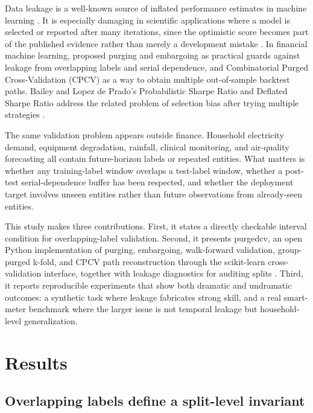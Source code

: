 \documentclass[10pt]{article}
\newcommand{\pcv}{\textsf{purgedcv}}
\newcommand{\pkg}[1]{\textsf{#1}}
\begin{document}
Data leakage is a well-known source of inflated performance estimates in
machine learning \citep{kaufman2012}. It is especially damaging in scientific
applications where a model is selected or reported after many iterations, since
the optimistic score becomes part of the published evidence rather than merely a
development mistake \citep{mcdermott2021}. In financial machine learning,
\citet{lopezdeprado2018afml} proposed purging and embargoing as practical
guards against leakage from overlapping labels and serial dependence, and
Combinatorial Purged Cross-Validation (CPCV) as a way to obtain multiple
out-of-sample backtest paths. Bailey and Lopez de Prado's Probabilistic Sharpe
Ratio and Deflated Sharpe Ratio address the related problem of selection bias
after trying multiple strategies \citep{bailey2012psr,bailey2014dsr}.

The same validation problem appears outside finance. Household electricity
demand, equipment degradation, rainfall, clinical monitoring, and air-quality
forecasting all contain future-horizon labels or repeated entities. What matters
is whether any training-label window overlaps a test-label window, whether a
post-test serial-dependence buffer has been respected, and whether the
deployment target involves unseen entities rather than future observations from
already-seen entities.

This study makes three contributions. First, it states a directly checkable
interval condition for overlapping-label validation. Second, it presents \pcv,
an open Python implementation of purging, embargoing, walk-forward validation,
group-purged k-fold, and CPCV path reconstruction through the
\pkg{scikit-learn} cross-validation interface, together with leakage
diagnostics for auditing splits \citep{pedregosa2011sklearn,purgedcv2026}.
Third, it reports reproducible experiments that show both dramatic and
undramatic outcomes: a synthetic task where leakage fabricates strong skill, and
a real smart-meter benchmark where the larger issue is not temporal leakage but
household-level generalization.

\section{Results}

\subsection{Overlapping labels define a split-level invariant}
\end{document}

